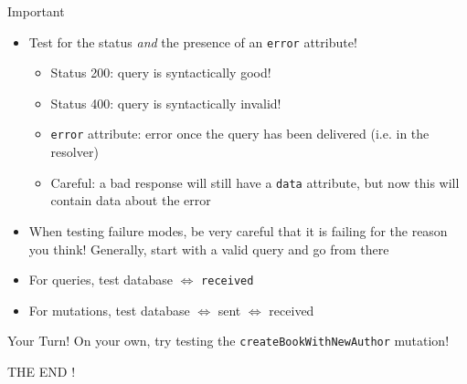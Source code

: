 \documentclass[t]{beamer}
\newcommand{\code}[1]{\texttt{#1}}
\begin{document}
	\begin{frame}{Important}
		\begin{itemize}
			\item Test for the status \emph{and} the presence of an \code{error} attribute!
				\begin{itemize}
					\item Status 200: query is syntactically good!
					\item Status 400: query is syntactically invalid!
					\item \code{error} attribute: error once the query has been delivered (i.e. in the resolver)
					\item Careful: a bad response will still have a \code{data} attribute, but now this will contain data about the error
				\end{itemize}
			\item When testing failure modes, be very careful that it is failing for the reason you think! Generally, start with a valid query and go from there
			\item For queries, test database $\iff$ \code{received}
			\item For mutations, test database $\iff$ sent $\iff$ received
		\end{itemize}
	\end{frame}

	\begin{frame}{Your Turn!}
		On your own, try testing the \code{createBookWithNewAuthor} mutation!
	\end{frame}

	\begin{frame}{THE END}
	!	
	\end{frame}
\end{document}
